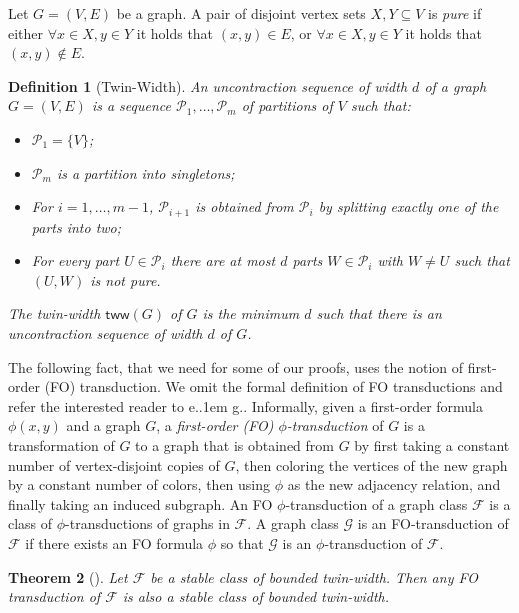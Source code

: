 \documentclass{article}
\makeatletter
\newtheorem{theorem}{Theorem}\newtheorem{lemma}[theorem]{Lemma}\newtheorem{proposition}[theorem]{Proposition}\newtheorem{corollary}[theorem]{Corollary}\newtheorem{definition}[theorem]{Definition}\newtheorem{claim}[theorem]{Claim}\newtheorem{remark}[theorem]{Remark}\newtheorem{observation}[theorem]{Observation}\newtheorem{conjecture}[theorem]{Conjecture}\newtheorem{example}[theorem]{Example}
\newcommand{\cF}{\ensuremath{\mathcal{F}}}
\newcommand{\cG}{\ensuremath{\mathcal{G}}}
\newcommand{\cP}{\ensuremath{\mathcal{P}}}
\newcommand{\tw}{\mathsf{tww}}
\newcommand*\eg{e.\kern.1em g.\@\xspace} %
\makeatother
\begin{document}
Let $G=(V,E)$ be a graph. A pair of disjoint vertex sets $X,Y \subseteq V$ is \emph{pure} if
either $\forall x \in X, y \in Y$ it holds that $(x,y) \in E$,
or $\forall x \in X, y \in Y$ it holds that $(x,y) \not\in E$.

\begin{definition}[Twin-Width]
\label{def:twin width}
An \emph{uncontraction sequence of width $d$} of a graph $G=(V,E)$ is a sequence
$\cP_1, \dotsc, \cP_m$ of partitions of $V$ such that:
\begin{itemize}
\item $\cP_1 = \{ V \}$;
\item $\cP_m$ is a partition into singletons;
\item For $i = 1, \dotsc, m-1$, $\cP_{i+1}$ is obtained from $\cP_i$ by splitting exactly one of the
parts into two;
\item For every part $U \in \cP_i$ there are at most $d$ parts $W \in \cP_i$ with $W \neq U$ such
that $(U,W)$ is not pure.
\end{itemize}
The \emph{twin-width} $\tw(G)$ of $G$ is the minimum $d$ such that there is an uncontraction sequence
of width $d$ of $G$.
\end{definition}

\noindent
The following fact, that we need for some of our proofs, uses the notion of first-order (FO) transduction.
We omit the formal definition of FO transductions and refer the interested reader to \eg \cite{GPT21}.
Informally, given a first-order formula $\phi(x,y)$ and a graph $G$, a \emph{first-order (FO) $\phi$-transduction} of $G$ is
a transformation of $G$ to 
a graph that is obtained from $G$ by first taking a constant number of vertex-disjoint copies of $G$, 
then coloring the vertices of the new graph by a constant number of colors, 
then using $\phi$ as the new adjacency relation, 
and finally taking an induced subgraph.
An FO $\phi$-transduction of a graph class $\cF$ is a class of $\phi$-transductions of graphs in $\cF$.
A graph class $\cG$ is an FO-transduction of $\cF$ if there exists an FO formula $\phi$ so that
$\cG$ is an $\phi$-transduction of $\cF$.


\begin{theorem}[\cite{BKTW20,NMP+21}]\label{th:stable-tw-FO}
	Let $\cF$ be a stable class of bounded twin-width. Then any FO transduction of $\cF$ is
	also a stable class of bounded twin-width.
\end{theorem}



\end{document}
